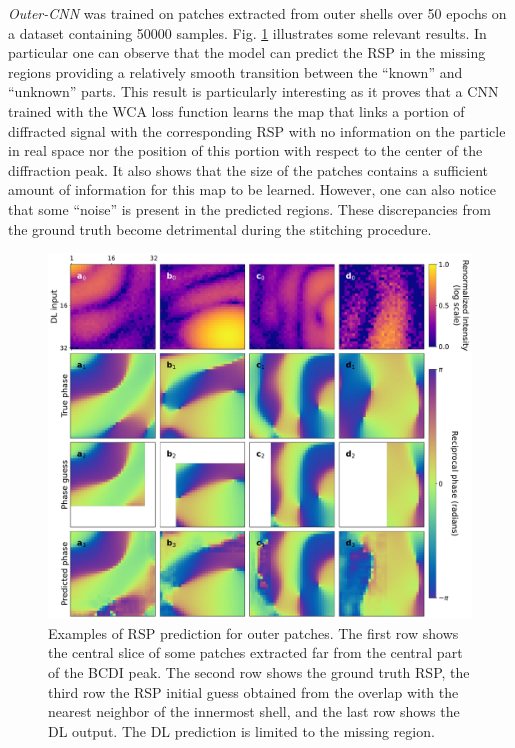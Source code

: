 \textit{Outer-CNN} was trained on patches extracted from outer shells over 50 epochs on a dataset containing 50000 samples. 
Fig. \ref{fig:outerpatch_obj_lowstrain} illustrates some relevant results. In particular one can observe that the model 
can predict the RSP in the missing regions providing a relatively smooth transition between the ``known'' and ``unknown''
parts. This result is particularly interesting as it proves that a CNN trained with the WCA loss function 
learns the map that links a portion of diffracted signal with the corresponding RSP with no information on the particle in
real space nor the position of this portion with respect to the center of the diffraction peak. It also shows that the 
size of the patches contains a sufficient amount of information for this map to be learned. 
However, one can also notice that some ``noise'' is present in the predicted regions. These discrepancies from the ground 
truth become detrimental during the stitching procedure. 

\begin{figure}[H]
    \centering
    \includegraphics[width=\textwidth]{figures/Phasing/outer_patches_low_strain_RSP.pdf}
    \caption{Examples of RSP prediction for outer patches. The first row shows the central slice of some patches extracted 
    far from the central part of the BCDI peak. The second row shows the ground truth RSP, the third row the RSP initial guess 
    obtained from the overlap with the nearest neighbor of the innermost shell, and the last row shows the 
    DL output. The DL prediction is limited to the missing region. }

    \label{fig:outerpatch_obj_lowstrain}
\end{figure}

